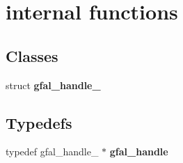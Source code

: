 \section{internal functions}
\label{group__internal__group}
\subsection*{Classes}
\begin{CompactItemize}
\item 
struct \textbf{gfal\_\-handle\_\-}
\end{CompactItemize}
\subsection*{Typedefs}
\begin{CompactItemize}
\item 
typedef gfal\_\-handle\_\- $\ast$ \textbf{gfal\_\-handle}\label{group__internal__group_g2d77c8b47f658f36507a7ddfeaa01559}

\end{CompactItemize}
